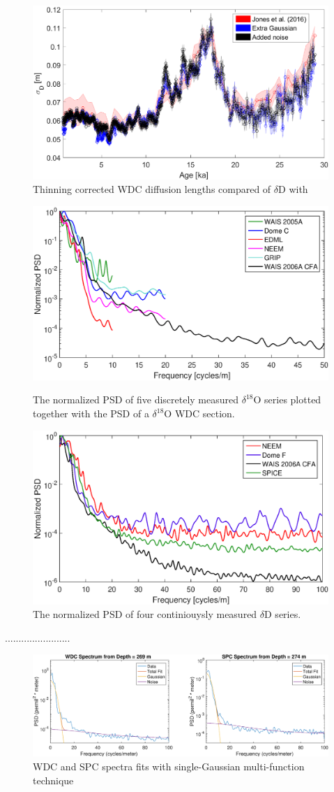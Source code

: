 \documentclass[draft, jgrga]{AGUTeX}
\begin{document}
\begin{figure}
	\includegraphics[width=.9\linewidth]{WAIS_diffusion_lengths_thinning_corr.eps}
	\caption{Thinning corrected WDC diffusion lengths compared of $\delta$D with \cite{Jones2016}} \label{WAIS_diffusion_lengths_thinning_corr}
\end{figure}




\begin{figure}
	\sidebyside
	{
		\includegraphics[width=.5\linewidth]{PSD_discrete_plus_cfa_v1.eps}
		\caption{The normalized PSD of five discretely measured $\delta^{18}\mathrm{O}$ series plotted together with the PSD of a $\delta^{18}\mathrm{O}$ WDC section.}\label{spectra_disVScfa}
	}
	{
			\includegraphics[width=.5\linewidth]{PSD_CFA_v1.eps}
		\caption{The normalized PSD of four continiouysly measured $\delta$D series.}\label{PSD_CFA_v1}
	}
\end{figure}
........................

\begin{figure}
\includegraphics[width=.9\linewidth]{1_gauss.eps}
\caption{WDC and SPC spectra fits with single-Gaussian multi-function technique}\label{1_gauss}
\end{figure}
\end{document}
